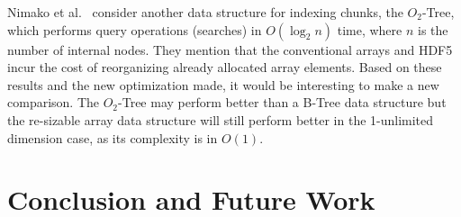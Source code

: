 Nimako et al.~\cite{Nimako2012} consider another data structure for indexing
chunks, the $O_{2}$-Tree, which performs query operations (searches) in
$O(\log_{2}{n})$ time, where $n$ is the number of internal nodes. They
mention that the conventional arrays and HDF5 incur the cost
of reorganizing already allocated array elements.
Based on these results and the new optimization made, it would be
interesting to make a new comparison. The $O_{2}$-Tree may perform
better than a B-Tree data structure but the re-sizable array data structure
will still perform better in the 1-unlimited dimension case, as its complexity
is in $O(1)$.


\section{Conclusion and Future Work}
\label{sec:conclusion}


